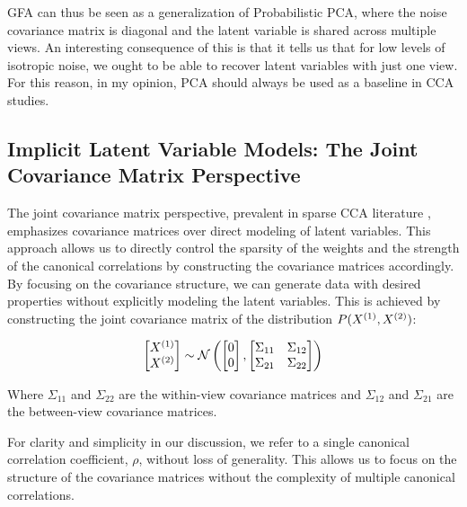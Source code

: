 GFA can thus be seen as a generalization of Probabilistic PCA, where the noise covariance matrix is diagonal and the latent variable is shared across multiple views.
An interesting consequence of this is that it tells us that for low levels of isotropic noise, we ought to be able to recover latent variables with just one view. For this reason, in my opinion, PCA should always be used as a baseline in CCA studies.

\subsection{Implicit Latent Variable Models: The Joint Covariance Matrix Perspective}

The joint covariance matrix perspective, prevalent in sparse CCA literature \citep{suo2017sparse,chen2013sparse}, emphasizes covariance matrices over direct modeling of latent variables.
This approach allows us to directly control the sparsity of the weights and the strength of the canonical correlations by constructing the covariance matrices accordingly. By focusing on the covariance structure, we can generate data with desired properties without explicitly modeling the latent variables.
This is achieved by constructing the joint covariance matrix of the distribution \(P(X^{(1)},X^{(2)})\):

\begin{align}
    \begin{bmatrix}
        X^{(1)} \\ X^{(2)}
    \end{bmatrix} \sim \mathcal{N} \left( \begin{bmatrix}
                                              0 \\ 0
    \end{bmatrix}, \begin{bmatrix}
                       \Sigma_{11} & \Sigma_{12} \\ \Sigma_{21} & \Sigma_{22}
    \end{bmatrix} \right)
\end{align}

Where \(\Sigma_{11}\) and \(\Sigma_{22}\) are the within-view covariance matrices and \(\Sigma_{12}\) and \(\Sigma_{21}\) are the between-view covariance matrices.

For clarity and simplicity in our discussion, we refer to a single canonical correlation coefficient, \(\rho\), without loss of generality.
This allows us to focus on the structure of the covariance matrices without the complexity of multiple canonical correlations.

